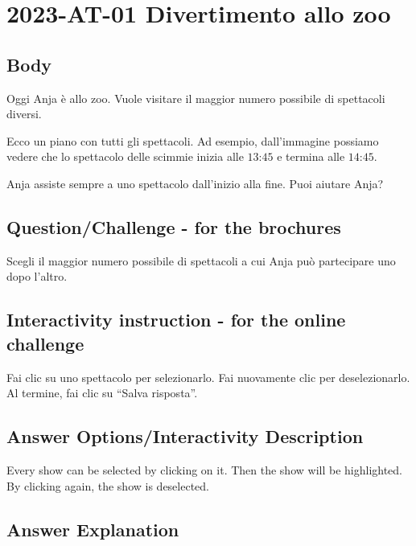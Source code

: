 \documentclass[a4paper,11pt]{report}
\newcommand{\taskGraphicsFolder}{..}
\begin{document}
\section*{\centering{} 2023-AT-01 Divertimento allo zoo}


\subsection*{Body}

Oggi Anja è allo zoo. Vuole visitare il maggior numero possibile di spettacoli diversi.

Ecco un piano con tutti gli spettacoli.
Ad esempio, dall’immagine possiamo vedere che lo spettacolo delle scimmie inizia alle $13$:$45$ e termina alle $14$:$45$.

{\centering%
\par}

Anja assiste sempre a uno spettacolo dall’inizio alla fine.
Puoi aiutare Anja?

{\em


\subsection*{Question/Challenge - for the brochures}

Scegli il maggior numero possibile di spettacoli a cui Anja può partecipare uno dopo l’altro.

}


\subsection*{Interactivity instruction - for the online challenge}

Fai clic su uno spettacolo per selezionarlo. Fai nuovamente clic per deselezionarlo. Al termine, fai clic su \enquote{Salva risposta}.

\begingroup
\renewcommand{\arraystretch}{1.5}
\subsection*{Answer Options/Interactivity Description}

Every show can be selected by clicking on it. Then the show will be highlighted. By clicking again, the show is deselected.

\endgroup

\subsection*{Answer Explanation}
\end{document}
